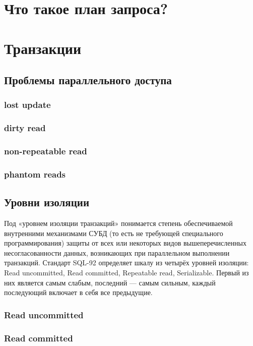 \section{Что такое план запроса?}

\section{Транзакции}

\subsection{Проблемы параллельного доступа}
\subsubsection{lost update}
\subsubsection{dirty read}
\subsubsection{non-repeatable read}
\subsubsection{phantom reads}

\subsection{Уровни изоляции}
Под «уровнем изоляции транзакций» понимается степень обеспечиваемой внутренними механизмами СУБД (то есть не требующей специального программирования) защиты от всех или некоторых видов вышеперечисленных несогласованности данных, возникающих при параллельном выполнении транзакций. Стандарт SQL-92 определяет шкалу из четырёх уровней изоляции: Read uncommitted, Read committed, Repeatable read, Serializable. Первый из них является самым слабым, последний — самым сильным, каждый последующий включает в себя все предыдущие. 

\subsubsection{Read uncommitted}
\subsubsection{Read committed}
